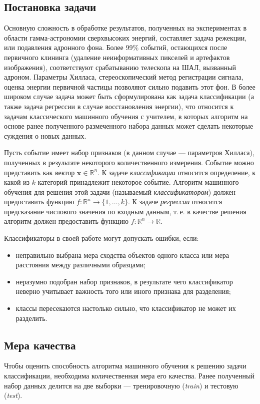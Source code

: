 \documentclass[magd,floatypics,numeref]{msudipl} %
\begin{document}
\subsection{Постановка задачи}
Основную сложность в обработке результатов, полученных на экспериментах в области гамма-астрономии сверхвысоких энергий, составляет задача режекции, или подавления адронного фона. Более 99\% событий, остающихся после первичного клининга (удаление неинформативных пикселей и артефактов изображения), соответствуют срабатыванию телескопа на ШАЛ, вызванный адроном. Параметры Хилласа, стереоскопический метод регистрации сигнала, оценка энергии первичной частицы позволяют сильно подавить этот фон. В более широком случае задача может быть сформулирована как задача классификации (а также задача регрессии в случае восстановления энергии), что относится к задачам классического машинного обучения с учителем, в которых алгоритм на основе ранее полученного размеченного набора данных может сделать некоторые суждения о новых данных. 

Пусть событие имеет набор признаков (в данном случае --- параметров Хилласа), полученных в результате некоторого количественного измерения. Событие можно представить как вектор 
$\mathbf{x}\in \mathds{R}^n$. К задаче \textit{классификации} относится определение, к какой из $k$ категорий принадлежит некоторое событие. Алгоритм машинного обучения для решения этой задачи (называемый \textit{классификатором}) должен предоставить функцию $f: \mathds{R}^n \rightarrow \{ 1, \dots, k\}$. К задаче \textit{регрессии} относится предсказание числового значения по входным данным, т.\,е. в качестве решения алгоритм должен предоставить функцию $f: \mathds{R}^n \rightarrow  \mathds{R}$. 

Классификаторы в своей работе могут допускать ошибки, если:
\begin{itemize}
\item неправильно выбрана мера сходства объектов одного класса или мера расстояния между различными образцами;
\item неразумно подобран набор признаков, в результате чего классификатор неверно учитывает важность того или иного признака для разделения;
\item классы пересекаются настолько сильно, что классификатор не может их разделить.
\end{itemize}
\subsection{Мера качества}
Чтобы оценить способность алгоритма машинного обучения к решению задачи классификации, необходима количественная мера его качества. Ранее полученный набор данных делится на две выборки --- тренировочную (\textit{train}) и тестовую (\textit{test}). 
\end{document}
